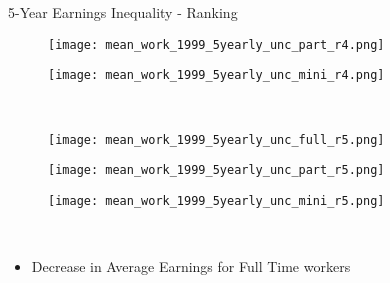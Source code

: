 \documentclass[hyperref={bookmarks=false}]{beamer}
\begin{document}
\begin{appendix}
\begin{frame}{5-Year Earnings Inequality - Ranking}
\begin{figure}[!t]
\begin{minipage}[b]{0.15\textwidth}{}
\centering
\texttt{[image: mean\_work\_1999\_5yearly\_unc\_part\_r4.png]}
\end{minipage}
\begin{minipage}[b]{0.15\textwidth}{}
\centering
\texttt{[image: mean\_work\_1999\_5yearly\_unc\_mini\_r4.png]}
\end{minipage}\\
\begin{minipage}[b]{0.15\textwidth}{}
\centering
\texttt{[image: mean\_work\_1999\_5yearly\_unc\_full\_r5.png]}
\end{minipage}
\begin{minipage}[b]{0.15\textwidth}{}
\centering
\texttt{[image: mean\_work\_1999\_5yearly\_unc\_part\_r5.png]}
\end{minipage}
\begin{minipage}[b]{0.15\textwidth}{}
\centering
\texttt{[image: mean\_work\_1999\_5yearly\_unc\_mini\_r5.png]}
\end{minipage}\\
\end{figure}
\begin{itemize}
\item Decrease in Average Earnings for Full Time workers
\end{itemize}
\end{frame}


\end{appendix}
\end{document}
